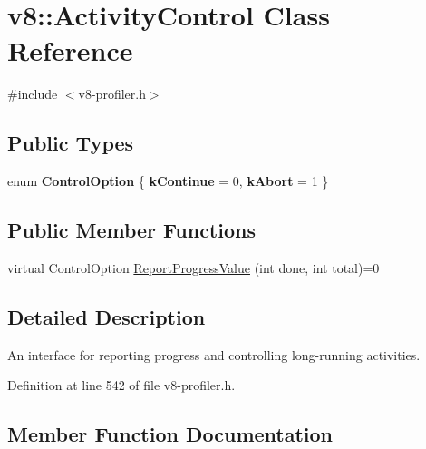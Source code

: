 \hypertarget{classv8_1_1ActivityControl}{}\section{v8\+:\+:Activity\+Control Class Reference}
\label{classv8_1_1ActivityControl}


{\ttfamily \#include $<$v8-\/profiler.\+h$>$}

\subsection*{Public Types}
\begin{DoxyCompactItemize}
\item 
\mbox{\label{classv8_1_1ActivityControl_a6d261e8c21e8076ce86b4add231a8ef9}} 
enum {\bfseries Control\+Option} \{ {\bfseries k\+Continue} = 0, 
{\bfseries k\+Abort} = 1
 \}
\end{DoxyCompactItemize}
\subsection*{Public Member Functions}
\begin{DoxyCompactItemize}
\item 
virtual Control\+Option \mbox{\hyperlink{classv8_1_1ActivityControl_a1300f10611306a3e8f79239e057eb0bf}{Report\+Progress\+Value}} (int done, int total)=0
\end{DoxyCompactItemize}


\subsection{Detailed Description}
An interface for reporting progress and controlling long-\/running activities. 

Definition at line 542 of file v8-\/profiler.\+h.



\subsection{Member Function Documentation}
\mbox{\label{classv8_1_1ActivityControl_a1300f10611306a3e8f79239e057eb0bf}} 
